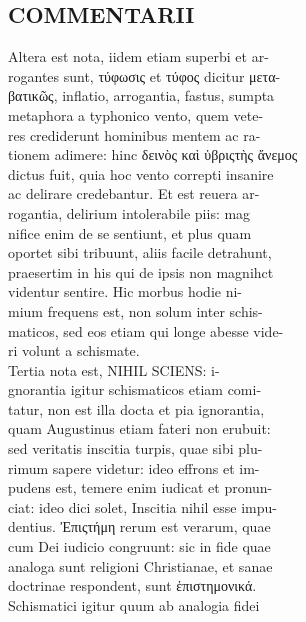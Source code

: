 \documentclass{article}
\begin{document}
\begin{pages}
\section*{COMMENTARII \\
                }
Altera est nota, iidem etiam superbi et ar- \\
                rogantes sunt, τύφωσις et τύφος dicitur  μετα- \\
                βατικῶς, inflatio, arrogantia, fastus, sumpta \\
                metaphora a typhonico vento, quem vete- \\
                res crediderunt hominibus mentem ac ra- \\
                tionem adimere: hinc δεινὸς καὶ ὑβριςτὴς ἄνεμος \\
                dictus fuit, quia hoc vento correpti insanire \\
                ac delirare credebantur. Et est reuera ar- \\
                rogantia, delirium intolerabile piis: mag \\
                nifice enim de se sentiunt, et plus quam \\
                oportet sibi tribuunt, aliis facile detrahunt, \\
                praesertim in his qui de ipsis non magnihct \\
                videntur sentire. Hic morbus hodie ni- \\
                mium frequens est, non solum inter schis- \\
                maticos, sed eos etiam qui longe abesse vide- \\
                ri volunt a schismate. \\
                Tertia nota est, NIHIL SCIENS: i- \\
                gnorantia igitur schismaticos etiam comi- \\
                tatur, non est illa docta et pia ignorantia, \\
                quam Augustinus etiam fateri non erubuit: \\
                sed veritatis inscitia turpis, quae sibi plu- \\
                rimum sapere videtur: ideo effrons et im- \\
                pudens est, temere enim iudicat et pronun- \\
                ciat: ideo dici solet, Inscitia nihil esse impu- \\
                dentius. Ἐπιςτήμη rerum est verarum, quae \\
                cum Dei iudicio congruunt: sic in fide quae \\
                analoga sunt religioni Christianae, et sanae \\
                doctrinae respondent, sunt ἑπιστημονικά. \\
                Schismatici igitur quum ab analogia fidei \\
                

\end{pages}
\end{document}
